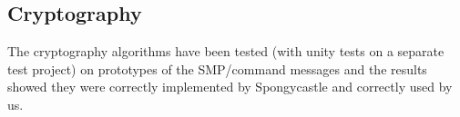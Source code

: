 \subsection{Cryptography}
\small{The cryptography algorithms have been tested (with unity tests on a separate test project) on prototypes of the SMP/command messages and the results showed they were correctly implemented by Spongycastle and correctly used by us.}